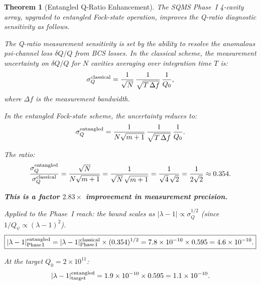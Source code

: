 \documentclass[11pt]{article}
\newcommand{\lam}{\lambda}
\newcommand{\ee}[1]{\times 10^{#1}}
\newcommand{\lbone}{|\lam - 1|}
\newtheorem{theorem}{Theorem}[section]
\theoremstyle{definition}
\theoremstyle{remark}
\begin{document}
\begin{theorem}[Entangled Q-Ratio Enhancement]
\label{thm:entangled}
The SQMS Phase~I 4-cavity array, upgraded to entangled Fock-state
operation, improves the Q-ratio diagnostic sensitivity as follows.

The Q-ratio measurement sensitivity is set by the ability to resolve
the anomalous psi-channel loss $\delta Q/Q$ from BCS losses. In the
classical scheme, the measurement uncertainty on $\delta Q/Q$ for
$N$ cavities averaging over integration time $T$ is:
\begin{equation}
\sigma_{Q}^{\rm classical} = \frac{1}{\sqrt{N}}\,
\frac{1}{\sqrt{T\,\Delta f}}\,\frac{1}{Q_0},
\label{eq:sigma_classical}
\end{equation}
where $\Delta f$ is the measurement bandwidth.

In the entangled Fock-state scheme, the uncertainty reduces to:
\begin{equation}
\sigma_{Q}^{\rm entangled} = \frac{1}{N\sqrt{m+1}}\,
\frac{1}{\sqrt{T\,\Delta f}}\,\frac{1}{Q_0}.
\label{eq:sigma_entangled}
\end{equation}

The ratio:
\begin{equation}
\frac{\sigma_Q^{\rm entangled}}{\sigma_Q^{\rm classical}}
= \frac{\sqrt{N}}{N\sqrt{m+1}} = \frac{1}{\sqrt{N}\,\sqrt{m+1}}
= \frac{1}{\sqrt{4}\,\sqrt{2}} = \frac{1}{2\sqrt{2}} \approx 0.354.
\label{eq:sigma_ratio}
\end{equation}

\textbf{This is a factor $2.83\times$ improvement in measurement precision.}

Applied to the Phase~I reach: the bound scales as
$\lbone \propto \sigma_Q^{1/2}$ (since $1/Q_\psi \propto (\lam-1)^2$).
\begin{equation}
\boxed{
\lbone^{\rm entangled}_{\rm Phase\,I} = \lbone^{\rm classical}_{\rm Phase\,I}
\times (0.354)^{1/2} = 7.8\ee{-10}\times 0.595 = 4.6\ee{-10}.
}
\label{eq:reach_entangled}
\end{equation}

At the target $Q_0 = 2\ee{11}$:
\begin{equation}
\lbone^{\rm entangled}_{\rm target} = 1.9\ee{-10}\times 0.595
= 1.1\ee{-10}.
\label{eq:reach_entangled_target}
\end{equation}
\end{theorem}
\end{document}
